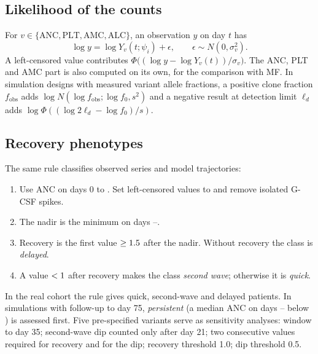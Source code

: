 \documentclass[11pt]{article}
\begin{document}


\subsection{Likelihood of the counts}
For $v\in\{\mathrm{ANC},\mathrm{PLT},\mathrm{AMC},\mathrm{ALC}\}$, an observation $y$ on day $t$ has
\begin{equation}
\log y = \log Y_v(t;\psi_i) + \epsilon,\qquad \epsilon\sim N(0,\sigma_v^2). \label{eq:obs}
\end{equation}
A left-censored value contributes $\Phi\bigl((\log y-\log Y_v(t))/\sigma_v\bigr)$. The ANC, PLT and AMC part is also computed on its own, for the comparison with MF. In simulation designs with measured variant allele fractions, a positive clone fraction $f_{\mathrm{obs}}$ adds $\log N(\log f_{\mathrm{obs}};\log f_0,s^2)$ and a negative result at detection limit $\ell_d$ adds $\log\Phi((\log 2\ell_d-\log f_0)/s)$.

\subsection{Recovery phenotypes}\label{sec:phenotypes}
The same rule \citep[thresholds of][]{rejeski2021} classifies observed series and model trajectories:
\begin{enumerate}
\item Use ANC on days 0 to \valPhWin. Set left-censored values to \valCensVal{} and remove isolated G-CSF spikes.
\item The nadir is the minimum on days \valNadFrom--\valNadTo.
\item Recovery is the first value $\geq1.5$ after the nadir. Without recovery the class is \emph{delayed}.
\item A value $<1$ after recovery makes the class \emph{second wave}; otherwise it is \emph{quick}.
\end{enumerate}
In the real cohort the rule gives \valNQuick{} quick, \valNSecond{} second-wave and \valNDelayed{} delayed patients. In simulations with follow-up to day 75, \emph{persistent} (a median ANC on days \valPersFrom--\valPersTo{} below \valPersThr) is assessed first. Five pre-specified variants serve as sensitivity analyses: window to day 35; second-wave dip counted only after day 21; two consecutive values required for recovery and for the dip; recovery threshold 1.0; dip threshold 0.5.
\end{document}
